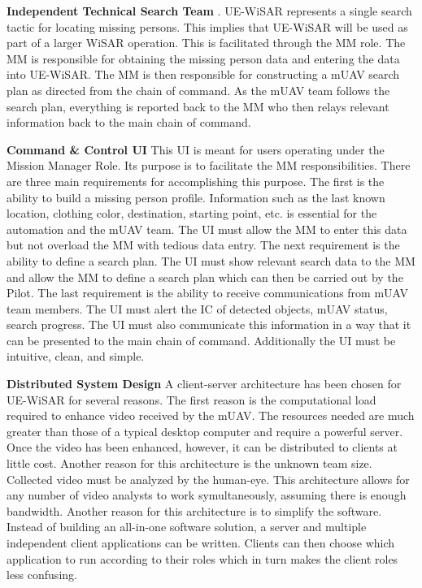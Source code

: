 \textbf{Independent Technical Search Team}
\cite{adams2009cognitive}.
UE-WiSAR represents a single search tactic for locating missing persons.  This
implies that UE-WiSAR will be used as part of a larger WiSAR operation.  This is
facilitated through the MM role.
The MM is responsible for obtaining the missing person data and entering the
data into UE-WiSAR.  The MM is then responsible for constructing a mUAV search
plan as directed from the chain of command.  As the mUAV team follows the
search plan, everything is reported back to the MM who then relays relevant
information back to the main chain of command.

\textbf{Command \& Control UI} This UI is meant for users operating under the
Mission Manager Role.  Its purpose is to facilitate the MM responsibilities. 
There are three main requirements for accomplishing this purpose.  The first is the ability to build a missing person profile. 
Information such as the last known location, clothing color, destination,
starting point, etc. is essential for the automation and the mUAV team. 
The UI must allow the MM to enter this data but not overload the MM with tedious
data entry.  The next requirement is the ability to define a search plan.  The
UI must show relevant search data to the MM and allow the MM to define a search
plan which can then be carried out by the Pilot.  The
last requirement is the ability to receive communications from mUAV team members.  The UI must alert the
IC of detected objects, mUAV status, search progress.  The UI must also
communicate this information in a way that it can be presented to the main chain
of command.  Additionally the UI must be intuitive, clean, and simple.

\textbf{Distributed System Design}  A client-server architecture has been chosen
for UE-WiSAR for several reasons.  The first reason is the computational load
required to enhance video received by the mUAV.  The resources needed are much
greater than those of a typical desktop computer and require a powerful server. 
Once the video has been enhanced, however, it can be distributed to clients at
little cost.  Another reason for this architecture is the unknown team size. 
Collected video must be analyzed by the human-eye.  This architecture allows for
any number of video analysts to work symultaneously, assuming there is enough bandwidth.
Another reason for this architecture is to simplify the software.  Instead of
building an all-in-one software solution, a server and multiple independent
client applications can be written.  Clients can then choose which application
to run according to their roles which in turn makes the client roles less
confusing.

